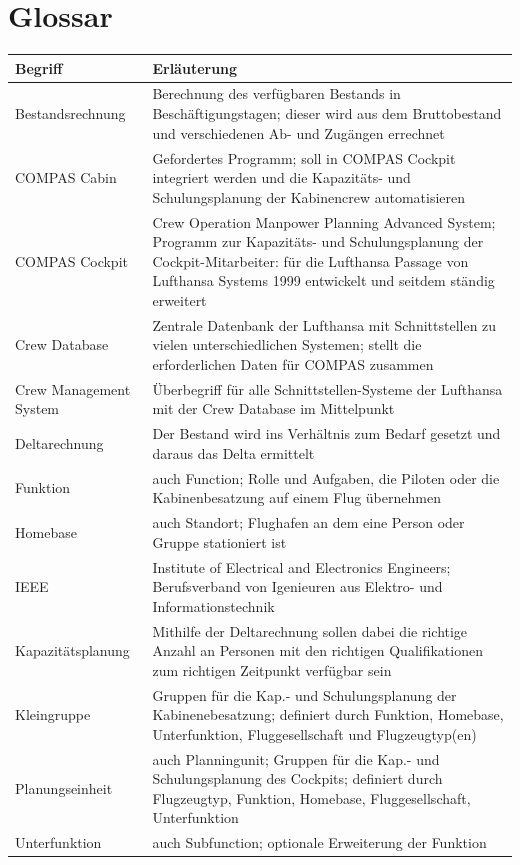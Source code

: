 \documentclass [12pt, a4paper, oneside, titlepage, ngerman]{article}
\begin{document}
\newpage






\newpage

\setcounter{page}{3}
\section* {Glossar}


\begin{tabularx}{\textwidth}{l|X}
\textbf{Begriff} & \textbf{Erläuterung} \\\hline
Bestandsrechnung & Berechnung des verfügbaren Bestands in Beschäftigungstagen; dieser wird aus dem Bruttobestand und verschiedenen Ab- und Zugängen errechnet\\
COMPAS Cabin & Gefordertes Programm; soll in COMPAS Cockpit integriert werden und die Kapazitäts- und Schulungsplanung der Kabinencrew automatisieren\\
COMPAS Cockpit & Crew Operation Manpower Planning Advanced System; Programm zur Kapazitäts- und Schulungsplanung der Cockpit-Mitarbeiter: für die Lufthansa Passage von Lufthansa Systems 1999 entwickelt und seitdem ständig erweitert\\
Crew Database & Zentrale Datenbank der Lufthansa mit Schnittstellen zu vielen unterschiedlichen Systemen; stellt die erforderlichen Daten für COMPAS zusammen\\
Crew Management System & Überbegriff für alle Schnittstellen-Systeme der Lufthansa mit der Crew Database im Mittelpunkt\\
Deltarechnung & Der Bestand wird ins Verhältnis zum Bedarf gesetzt und daraus das Delta ermittelt\\
Funktion & auch Function; Rolle und Aufgaben, die Piloten oder die Kabinenbesatzung auf einem Flug übernehmen \\
Homebase & auch Standort; Flughafen an dem eine Person oder Gruppe stationiert ist \\  
IEEE & Institute of Electrical and Electronics Engineers; Berufsverband von Igenieuren aus Elektro- und Informationstechnik \\
Kapazitätsplanung & Mithilfe der Deltarechnung sollen dabei die richtige Anzahl an Personen mit den richtigen Qualifikationen zum richtigen Zeitpunkt verfügbar sein\\
Kleingruppe & Gruppen für die Kap.- und Schulungsplanung der Kabinenebesatzung; definiert durch  Funktion, Homebase, Unterfunktion, Fluggesellschaft und Flugzeugtyp(en)\\
Planungseinheit & auch Planningunit; Gruppen für die Kap.- und Schulungsplanung des Cockpits; definiert durch Flugzeugtyp, Funktion, Homebase, Fluggesellschaft, Unterfunktion\\
Unterfunktion & auch Subfunction; optionale Erweiterung der Funktion \\

\end{tabularx}
\end{document}
